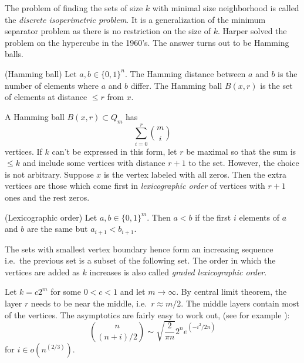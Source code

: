 The problem of finding the sets of size $k$ with minimal size neighborhood is 
called the \textit{discrete isoperimetric problem}. It is a generalization of 
the minimum separator problem as there is no restriction on the size of $k$. 
Harper \cite{Harp} solved the problem on the hypercube in the 1960's. The 
answer turns out to be Hamming balls.

\begin{definition}
 (Hamming ball) Let $a,b \in \{0,1\}^n$. The Hamming distance between $a$ and 
$b$ is the number of elements where $a$ and $b$ differ. The Hamming ball 
$B(x,r)$ is the set of elements at distance $\leq r$ from $x$.
\end{definition}

A Hamming ball $B(x,r) \subset Q_m$ has 
\begin{equation}
 \sum_{i=0}^r {m \choose i}
\end{equation}
vertices. If $k$ can't be expressed in this form, let $r$ be maximal so that 
the sum is $\leq k$ and include some vertices with distance $r+1$ to the set. 
However, the choice is not arbitrary. Suppose $x$ is the vertex labeled with 
all zeros. Then the extra vertices are those which come first in 
\textit{lexicographic order} of vertices with $r+1$ ones and the rest zeros.
\begin{definition}
 (Lexicographic order) Let $a,b \in \{0,1\}^m$. Then $a<b$ if the first $i$ 
elements of $a$ and $b$ are the same but $a_{i+1} < b_{i+1}$.
\end{definition}
The sets with smallest vertex boundary hence form an increasing sequence i.e.\ 
the previous set is a subset of the following set. The order in which the 
vertices are added as $k$ increases is also called \textit{graded lexicographic 
order}.

Let $k = c2^m$ for some $0<c<1$ and let $m \rightarrow \infty$. By central limit theorem, 
the layer $r$ needs to be near the middle, i.e.\ $r\approx m/2$. The middle layers contain most of the vertices.
The asymptotics are fairly easy to work out, (see for example \cite{Spencer:Asymptopia}):
\begin{equation}
\binom{n}{(n+i)/2} \sim \sqrt{\frac{2}{\pi n}} 2^n e^{\left(-i^2/2n\right)}  
\end{equation}
for $i \in o(n^{(2/3)})$.


